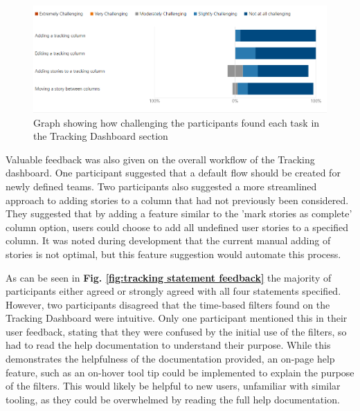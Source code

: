 \documentclass[l4proj.tex]{subfiles}
\begin{document}
\begin{figure}[h!]
\begin{center}
\includegraphics[scale=0.5]{dissertation/images/EvaluationTrackingChallengingGraph.png}
\caption{Graph showing how challenging the participants found each task in the Tracking Dashboard section}
\label{fig:tracking form feedback} 
\end{center}
\end{figure}

Valuable feedback was also given on the overall workflow of the Tracking dashboard. One participant suggested that a default flow should be created for newly defined teams. Two participants also suggested a more streamlined approach to adding stories to a column that had not previously been considered. They suggested that by adding a feature similar to the 'mark stories as complete' column option, users could choose to add all undefined user stories to a specified column. It was noted during development that the current manual adding of stories is not optimal, but this feature suggestion would automate this process.

As can be seen in \textbf{Fig. \ref{fig:tracking statement feedback}} the majority of participants either agreed or strongly agreed with all four statements specified. However, two participants disagreed that the time-based filters found on the Tracking Dashboard were intuitive. Only one participant mentioned this in their user feedback, stating that they were confused by the initial use of the filters, so had to read the help documentation to understand their purpose. While this demonstrates the helpfulness of the documentation provided, an on-page help feature, such as an on-hover tool tip could be implemented to explain the purpose of the filters. This would likely be helpful to new users, unfamiliar with similar tooling, as they could be overwhelmed by reading the full help documentation.
\end{document}

